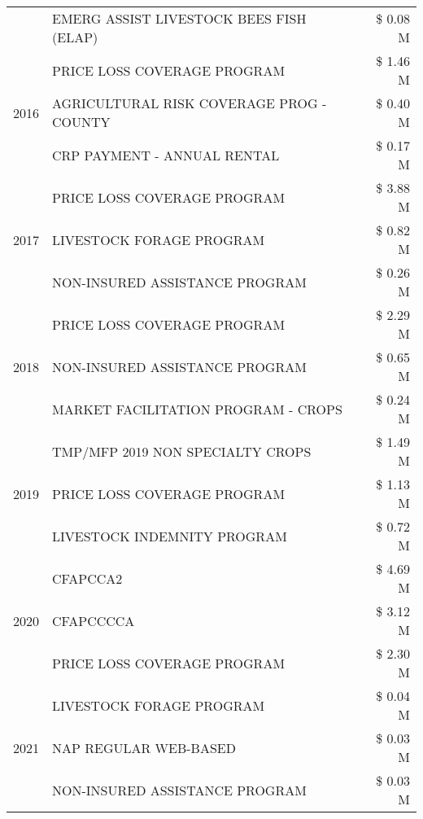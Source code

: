 \begin{tabular}{llr}
 & EMERG ASSIST LIVESTOCK BEES FISH (ELAP) & \$ 0.08 M \\
\cline{1-3}
\multirow[t]{3}{*}{2016} & PRICE LOSS COVERAGE PROGRAM & \$ 1.46 M \\
 & AGRICULTURAL RISK COVERAGE PROG - COUNTY & \$ 0.40 M \\
 & CRP PAYMENT - ANNUAL RENTAL & \$ 0.17 M \\
\cline{1-3}
\multirow[t]{3}{*}{2017} & PRICE LOSS COVERAGE PROGRAM & \$ 3.88 M \\
 & LIVESTOCK FORAGE PROGRAM & \$ 0.82 M \\
 & NON-INSURED ASSISTANCE PROGRAM & \$ 0.26 M \\
\cline{1-3}
\multirow[t]{3}{*}{2018} & PRICE LOSS COVERAGE PROGRAM & \$ 2.29 M \\
 & NON-INSURED ASSISTANCE PROGRAM & \$ 0.65 M \\
 & MARKET FACILITATION PROGRAM - CROPS & \$ 0.24 M \\
\cline{1-3}
\multirow[t]{3}{*}{2019} & TMP/MFP 2019 NON SPECIALTY CROPS & \$ 1.49 M \\
 & PRICE LOSS COVERAGE PROGRAM & \$ 1.13 M \\
 & LIVESTOCK INDEMNITY PROGRAM & \$ 0.72 M \\
\cline{1-3}
\multirow[t]{3}{*}{2020} & CFAPCCA2 & \$ 4.69 M \\
 & CFAPCCCCA & \$ 3.12 M \\
 & PRICE LOSS COVERAGE PROGRAM & \$ 2.30 M \\
\cline{1-3}
\multirow[t]{3}{*}{2021} & LIVESTOCK FORAGE PROGRAM & \$ 0.04 M \\
 & NAP REGULAR WEB-BASED & \$ 0.03 M \\
 & NON-INSURED ASSISTANCE PROGRAM & \$ 0.03 M \\
\cline{1-3}
\bottomrule
\end{tabular}
